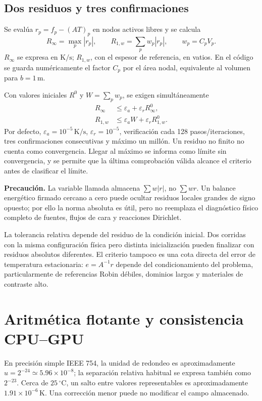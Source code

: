\documentclass[11pt,a4paper]{article}
\newcommand{\Rinf}{R_{\infty}}
\newcommand{\Rone}{R_{1,w}}
\newcommand{\code}[1]{\texttt{\detokenize{#1}}}
\newcommand{\nota}[1]{\par\smallskip\noindent\textbf{Precaución.} #1\par\smallskip}
\begin{document}
\subsection{Dos residuos y tres confirmaciones}
Se evalúa $r_p=f_p-(AT)_p$ en nodos activos libres y se calcula
\begin{equation}
 \Rinf=\max_p|r_p|,\qquad
 \Rone=\sum_p w_p|r_p|,\qquad w_p=C_pV_p.
 \label{eq:steadyres}
\end{equation}
$\Rinf$ se expresa en $\mathrm{K/s}$; $\Rone$, con el espesor de referencia,
en vatios. En el código se guarda numéricamente el factor $C_p$ por el área
nodal, equivalente al volumen para $b=1\,\mathrm m$.

Con valores iniciales $R^0$ y $W=\sum_pw_p$, se exigen simultáneamente
\begin{align}
 \Rinf&\le\varepsilon_a+\varepsilon_r R_\infty^0,\\
 \Rone&\le\varepsilon_a W+\varepsilon_r R_{1,w}^0.
 \label{eq:steadystop}
\end{align}
Por defecto, $\varepsilon_a=10^{-5}\,\mathrm{K/s}$,
$\varepsilon_r=10^{-5}$, verificación cada 128 pasos/iteraciones,
tres confirmaciones consecutivas y máximo un millón. Un residuo no finito
no cuenta como convergencia. Llegar al máximo se informa como límite sin
convergencia, y se permite que la última comprobación válida alcance el
criterio antes de clasificar el límite.

\nota{La variable llamada \code{balance} almacena $\sum w|r|$, no
$\sum wr$. Un balance energético firmado cercano a cero puede ocultar residuos
locales grandes de signo opuesto; por ello la norma absoluta es útil, pero no
reemplaza el diagnóstico físico completo de fuentes, flujos de cara y
reacciones Dirichlet.}

La tolerancia relativa depende del residuo de la condición inicial. Dos
corridas con la misma configuración física pero distinta inicialización
pueden finalizar con residuos absolutos diferentes. El criterio tampoco es
una cota directa del error de temperatura estacionaria:
$e=A^{-1}r$ depende del condicionamiento del problema, particularmente de
referencias Robin débiles, dominios largos y materiales de contraste alto.

\FloatBarrier
\section{Aritmética flotante y consistencia CPU--GPU}
\label{sec:precision}
En precisión simple IEEE 754, la unidad de redondeo es aproximadamente
$u=2^{-24}\simeq5.96\times10^{-8}$; la separación relativa habitual se expresa
también como $2^{-23}$. Cerca de $25\,{}^\circ\mathrm C$, un salto entre
valores representables es aproximadamente $1.91\times10^{-6}\,\mathrm K$.
Una corrección menor puede no modificar el campo almacenado.
\end{document}
